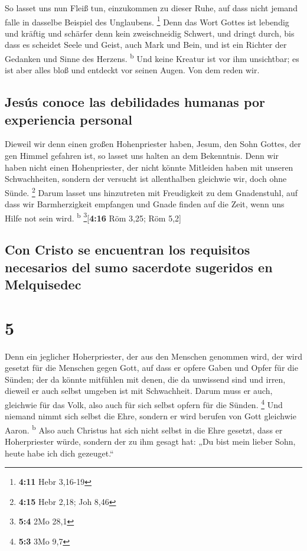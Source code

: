  So lasset uns nun Fleiß tun, einzukommen zu dieser Ruhe,
auf dass nicht jemand falle in dasselbe Beispiel des Unglaubens.
\footnote{\textbf{4:11} Hebr 3,16-19}  Denn das Wort
Gottes ist lebendig und kräftig und schärfer denn kein zweischneidig
Schwert, und dringt durch, bis dass es scheidet Seele und Geist, auch
Mark und Bein, und ist ein Richter der Gedanken und Sinne des Herzens.
\textsuperscript{b}  Und keine Kreatur ist vor ihm
unsichtbar; es ist aber alles bloß und entdeckt vor seinen Augen. Von
dem reden wir.

\hypertarget{jesuxfas-conoce-las-debilidades-humanas-por-experiencia-personal}{%
\subsection{Jesús conoce las debilidades humanas por experiencia
personal}\label{jesuxfas-conoce-las-debilidades-humanas-por-experiencia-personal}}

 Dieweil wir denn einen großen Hohenpriester haben,
Jesum, den Sohn Gottes, der gen Himmel gefahren ist, so lasset uns
halten an dem Bekenntnis.  Denn wir haben nicht einen
Hohenpriester, der nicht könnte Mitleiden haben mit unseren
Schwachheiten, sondern der versucht ist allenthalben gleichwie wir, doch
ohne Sünde. \footnote{\textbf{4:15} Hebr 2,18; Joh 8,46} 
Darum lasset uns hinzutreten mit Freudigkeit zu dem Gnadenstuhl, auf
dass wir Barmherzigkeit empfangen und Gnade finden auf die Zeit, wenn
uns Hilfe not sein wird. \textsuperscript{b} \footnote{\textbf{5:4} 2Mo
  28,1}{[}\textbf{4:16} Röm 3,25; Röm 5,2{]}

\hypertarget{con-cristo-se-encuentran-los-requisitos-necesarios-del-sumo-sacerdote-sugeridos-en-melquisedec}{%
\subsection{Con Cristo se encuentran los requisitos necesarios del sumo
sacerdote sugeridos en
Melquisedec}\label{con-cristo-se-encuentran-los-requisitos-necesarios-del-sumo-sacerdote-sugeridos-en-melquisedec}}

\hypertarget{section-4}{%
\section{5}\label{section-4}}

 Denn ein jeglicher Hoherpriester, der aus den Menschen
genommen wird, der wird gesetzt für die Menschen gegen Gott, auf dass er
opfere Gaben und Opfer für die Sünden;  der da könnte
mitfühlen mit denen, die da unwissend sind und irren, dieweil er auch
selbst umgeben ist mit Schwachheit.  Darum muss er auch,
gleichwie für das Volk, also auch für sich selbst opfern für die Sünden.
\footnote{\textbf{5:3} 3Mo 9,7}  Und niemand nimmt sich
selbst die Ehre, sondern er wird berufen von Gott gleichwie Aaron.
\textsuperscript{b}  Also auch Christus hat sich nicht
selbst in die Ehre gesetzt, dass er Hoherpriester würde, sondern der zu
ihm gesagt hat: „Du bist mein lieber Sohn, heute habe ich dich
gezeuget.``

